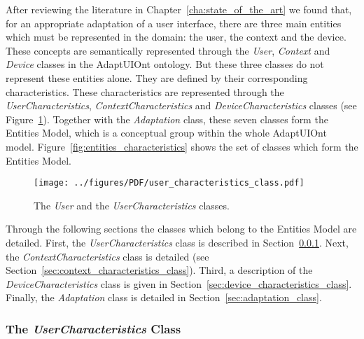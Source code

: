 After reviewing the literature in Chapter~\ref{cha:state_of_the_art} we found
that, for an appropriate adaptation of a user interface, there are three main
entities which must be represented in the domain: the user, the context and the
device. These concepts are semantically represented through the \textit{User},
\textit{Context} and \textit{Device} classes in the AdaptUIOnt ontology. But 
these three classes do not represent these entities alone. They are defined by 
their corresponding characteristics. These characteristics are represented through 
the \textit{UserCharacteristics}, \textit{ContextCharacteristics} and
\textit{DeviceCharacteristics} classes (see Figure~\ref{fig:user_characteristics_class}).
Together with the \textit{Adaptation} class, these seven classes form the Entities
Model, which is a conceptual group within the whole AdaptUIOnt model.
Figure~\ref{fig:entities_characteristics} shows the set of classes which form
the Entities Model.

\begin{figure}
\centering
\texttt{[image: ../figures/PDF/user\_characteristics\_class.pdf]}
\caption{The \textit{User} and the \textit{UserCharacteristics} classes.}
\label{fig:user_characteristics_class}
\end{figure}

Through the following sections the classes which belong to the Entities Model
are detailed. First, the \textit{UserCharacteristics} class is described in
Section~\ref{sec:user_characteristics_class}. Next, the \textit{ContextCharacteristics}
class is detailed (see Section~\ref{sec:context_characteristics_class}). Third,
a description of the \textit{DeviceCharacteristics} class is given in
Section~\ref{sec:device_characteristics_class}. Finally, the \textit{Adaptation}
class is detailed in Section~\ref{sec:adaptation_class}.


\subsubsection{The \textit{UserCharacteristics} Class}
\label{sec:user_characteristics_class}

